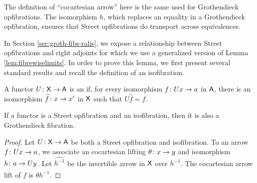 \documentclass{amsart}
\begin{document}
\begin{figure}[h]
\end{figure}

The definition of ``cocartesian arrow'' here is the same used for
Grothendieck opfibrations. The isomorphism $ h $, which replaces an
equality in a Grothendieck opfibration, ensures that Street
opfibrations do transport across equivalences. 

In Section \ref{sec:groth-fibs-ralis}, we expose a relationship
between Street opfibrations and right adjoints for which we use a
generalized version of Lemma \ref{lem:fibrewiselimits}. In order to
prove this lemma, we first present several standard results and recall
the definition of an isofibration.

\begin{defn}
  A functor $U \colon \mathsf{X} \to \mathsf{A}$ is an  if, for
  every isomorphism $f \colon Ux \to a$ in $\mathsf{A}$, there is an
  isomorphism $\widehat{f} \colon x \to x'$ in $\mathsf{X}$ such that $U\hat{f}=f$.
\end{defn}

\begin{lem} \label{lem:street_and_iso_is_groth} If a functor is a
  Street opfibration and an isofibration, then it is also a
  Grothendieck fibration.
\end{lem}

\begin{proof}
  Let $U \colon\mathsf{X} \to \mathsf{A}$ be both a Street opfibration and
  isofibration. To an arrow $f \colon Ux \to a$, we associate an
  cocartesian lifting $\theta \colon x \to y$ and isomorphism
  $h \colon a \to Uy$. Let $\hat{h^{-1}}$ be the invertible arrow in
  $\mathsf{X}$ over $h^{-1}$. The cocartesian arrow lift of $f$ is
  $\theta \hat{h^{-1}}$.
\end{proof}
\end{document}
